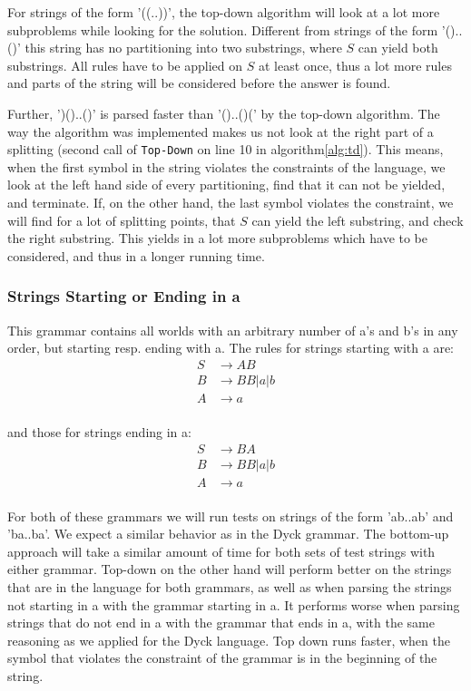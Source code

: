 For strings of the form '((..))', the top-down algorithm will look at a lot more subproblems while looking for the solution.
Different from strings of the form '()..()' this string has no partitioning into two substrings, where $S$ can yield both substrings.
All rules have to be applied on $S$ at least once, thus a lot more rules and parts of the string will be considered before the answer is found.

Further, ')()..()' is parsed faster than '()..()(' by the top-down algorithm.
The way the algorithm was implemented makes us not look at the right part of a splitting (second call of \texttt{Top-Down} on line 10 in algorithm\ref{alg:td}).
This means, when the first symbol in the string violates the constraints of the language, we look at the left hand side of every partitioning, find that it can not be yielded, and terminate.
If, on the other hand, the last symbol violates the constraint, we will find for a lot of splitting points, that $S$ can yield the left substring, and check the right substring.
This yields in a lot more subproblems which have to be considered, and thus in a longer running time.


\subsubsection{Strings Starting or Ending in a}
This grammar contains all worlds with an arbitrary number of a's and b's in any order, but starting resp. ending with a.
The rules for strings starting with a are:
\begin{align*}
    S&\rightarrow AB\\
    B&\rightarrow BB|a|b\\
    A&\rightarrow a\\
\end{align*}

and those for strings ending in a:
\begin{align*}
    S&\rightarrow BA\\
    B&\rightarrow BB|a|b\\
    A&\rightarrow a\\
\end{align*}

For both of these grammars we will run tests on strings of the form 'ab..ab' and 'ba..ba'.
We expect a similar behavior as in the Dyck grammar.
The bottom-up approach will take a similar amount of time for both sets of test strings with either grammar.
Top-down on the other hand will perform better on the strings that are in the language for both grammars, as well as when parsing the strings not starting in a with the grammar starting in a.
It performs worse when parsing strings that do not end in a with the grammar that ends in a, with the same reasoning as we applied for the Dyck language.
Top down runs faster, when the symbol that violates the constraint of the grammar is in the beginning of the string.


